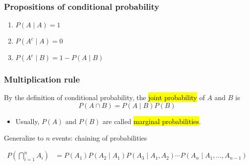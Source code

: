 \documentclass[slidestop,compress,mathserif]{beamer}
\begin{document}
\begin{frame}\frametitle{Propositions of conditional probability}

\begin{enumerate}
\item $P(A \mid A) = 1$ 
\vspace{1.5cm}
\item $P(A^c \mid A) = 0$ 
\vspace{1.5cm}
\item $P(A^c \mid B) = 1 - P(A \mid B)$
\vspace{1.5cm}
\end{enumerate}


\end{frame}

\begin{frame}\frametitle{Multiplication rule}


\begin{dinglist}{\DingListSymbolA}
\item By the definition of conditional probability, the \hl{joint probability} of $A$ and $B$ is
\[ P(A \cap B) = P(A \mid B)P(B) \]
  \begin{itemize}
  \item Usually, $P(A)$ and $P(B)$ are called \hl{marginal probabilities}.
  \end{itemize}

\vspace{0.5cm}

\item Generalize to $n$ events: chaining of probabilities
\end{dinglist}
\begin{align*}
P\left(\bigcap_{i=1}^n A_i\right)
	& = P(A_1) P(A_2 \mid A_1) P(A_3 \mid  A_1, A_2) \cdots P(A_n  \mid  A_1,\ldots,A_{n-1})\\
\end{align*}



\end{frame}
\end{document}
